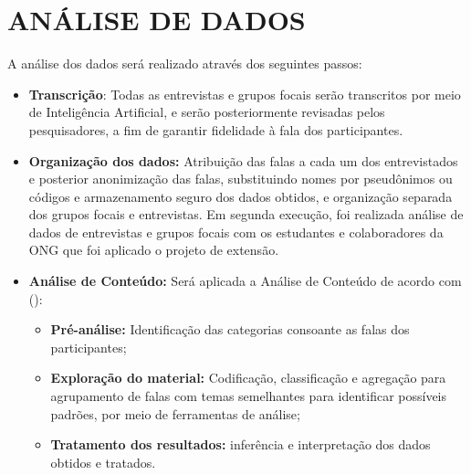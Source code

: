 \section{ANÁLISE DE DADOS}
\label{analisededados}

A análise dos dados será realizado através dos seguintes passos:

\begin{itemize}
    \item \textbf{Transcrição}: Todas as entrevistas e grupos focais serão transcritos por meio de Inteligência Artificial, e serão posteriormente revisadas pelos pesquisadores, a fim de garantir fidelidade à fala dos participantes.
    \item \textbf{Organização dos dados:} Atribuição das falas a cada um dos entrevistados e posterior anonimização das falas, substituindo nomes por pseudônimos ou códigos e armazenamento seguro dos dados obtidos, e organização separada dos grupos focais e entrevistas. Em segunda execução, foi realizada análise de dados de entrevistas e grupos focais com os estudantes e colaboradores da ONG que foi aplicado o projeto de extensão. 
    \item \textbf{Análise de Conteúdo:} Será aplicada a Análise de Conteúdo de acordo com \citeauthor{bardin2011} (\citeyear{bardin2011}):
	\begin{itemize}
	    \item \textbf{Pré-análise:} Identificação das categorias consoante as falas dos participantes;
	\item \textbf{Exploração do material:} Codificação, classificação e agregação para agrupamento de falas com temas semelhantes para identificar possíveis padrões, por meio de ferramentas de análise;
	\item \textbf{Tratamento dos resultados:} inferência e interpretação dos dados obtidos e tratados.
	\end{itemize}


\end{itemize}